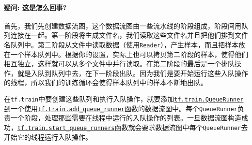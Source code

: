 \begin{Shaded}
\begin{Highlighting}[]
\OperatorTok{=} 

\OperatorTok{=} 


\OperatorTok{=} 
\OperatorTok{=} \OperatorTok{=}\OperatorTok{=}

\NormalTok{:}
      

 
     
\NormalTok{:}

\end{Highlighting}
\end{Shaded}

\paragraph{疑问: 这是怎么回事?
}\label{ux7591ux95ee-ux8fd9ux662fux600eux4e48ux56deux4e8b}

首先，我们先创建数据流图，这个数据流图由一些流水线的阶段组成，阶段间用队列连接在一起。第一阶段将生成文件名，我们读取这些文件名并且把他们排到文件名队列中。第二阶段从文件中读取数据（使用\texttt{Reader}），产生样本，而且把样本放在一个样本队列中。根据你的设置，实际上也可以拷贝第二阶段的样本，使得他们相互独立，这样就可以从多个文件中并行读取。在第二阶段的最后是一个排队操作，就是入队到队列中去，在下一阶段出队。因为我们是要开始运行这些入队操作的线程，所以我们的训练循环会使得样本队列中的样本不断地出队。

在\texttt{tf.train}中要创建这些队列和执行入队操作，就要添加\href{../../api_docs/python/train.md\#QueueRunner}{\texttt{tf.train.QueueRunner}}到一个使用\href{../../api_docs/python/train.md\#add_queue_runner}{\texttt{tf.train.add\_queue\_runner}}函数的数据流图中。每个\texttt{QueueRunner}负责一个阶段，处理那些需要在线程中运行的入队操作的列表。一旦数据流图构造成功，\href{../../api_docs/python/train.md\#start_queue_runners}{\texttt{tf.train.start\_queue\_runners}}函数就会要求数据流图中每个\texttt{QueueRunner}去开始它的线程运行入队操作。

